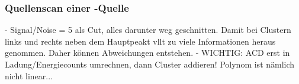 \FloatBarrier
\subsubsection{Quellenscan einer \texorpdfstring{}{Sr}-Quelle}
\label{sec:Quellenscan-Auswertung}

- Signal/Noise = 5 als Cut, alles darunter weg geschnitten. Damit bei Clustern
links und rechts neben dem Hauptpeakt vllt zu viele Informationen heraus genommen.
Daher können Abweichungen entstehen.
- WICHTIG: ACD erst in Ladung/Energiecounts umrechnen, dann Cluster addieren!
Polynom ist nämlich nicht linear...
